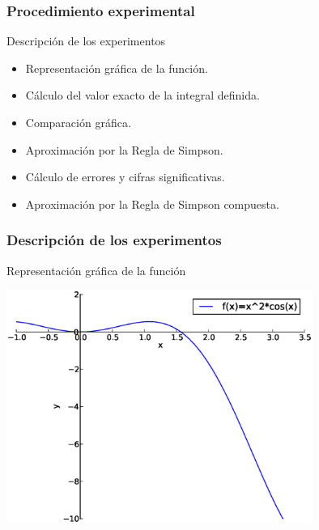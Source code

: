 \documentclass{beamer}
\begin{document}
\begin{frame}

  \frametitle{Procedimiento experimental}

  \begin{block}{Descripci\'on de los experimentos}
    \begin{itemize}
      \item Representación gráfica de la función.
      \item Cálculo del valor exacto de la integral definida. 
      \item Comparación gráfica.
      \item Aproximación por la Regla de Simpson.
      \item Cálculo de errores y cifras significativas.
      \item Aproximación por la Regla de Simpson compuesta.
    \end{itemize}
  \end{block}

\end{frame}
\begin{frame}

  \frametitle{Descripción de los experimentos}
  
  \begin{block}{Representación gráfica de la función}
    \begin{center}
      \includegraphics[width=0.75\textwidth]{img/grafica1.eps}
    \end{center}
  \end{block}

\end{frame}
\end{document}
